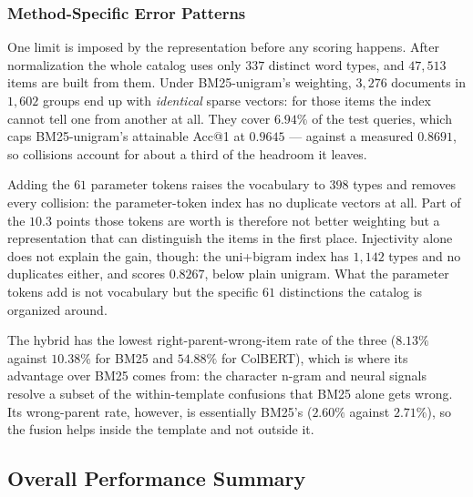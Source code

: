 \documentclass[preprint,review,12pt]{elsarticle}
\begin{document}
\subsubsection{Method-Specific Error Patterns}

One limit is imposed by the representation before any scoring happens. After normalization the whole catalog uses only $337$ distinct word types, and $47{,}513$ items are built from them. Under BM25-unigram's weighting, $3{,}276$ documents in $1{,}602$ groups end up with \emph{identical} sparse vectors: for those items the index cannot tell one from another at all. They cover $6.94\%$ of the test queries, which caps BM25-unigram's attainable Acc@1 at $0.9645$ --- against a measured $0.8691$, so collisions account for about a third of the headroom it leaves.

Adding the $61$ parameter tokens raises the vocabulary to $398$ types and removes every collision: the parameter-token index has no duplicate vectors at all. Part of the $10.3$ points those tokens are worth is therefore not better weighting but a representation that can distinguish the items in the first place. Injectivity alone does not explain the gain, though: the uni+bigram index has $1{,}142$ types and no duplicates either, and scores $0.8267$, below plain unigram. What the parameter tokens add is not vocabulary but the specific $61$ distinctions the catalog is organized around.

The hybrid has the lowest right-parent-wrong-item rate of the three ($8.13\%$ against $10.38\%$ for BM25 and $54.88\%$ for ColBERT), which is where its advantage over BM25 comes from: the character n-gram and neural signals resolve a subset of the within-template confusions that BM25 alone gets wrong. Its wrong-parent rate, however, is essentially BM25's ($2.60\%$ against $2.71\%$), so the fusion helps inside the template and not outside it.

\subsection{Overall Performance Summary}
\label{sec:4.7_Overall Performance Summary}
\end{document}
